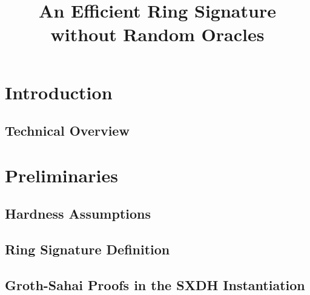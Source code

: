 \documentclass{llncs}
\title{An Efficient Ring Signature without Random Oracles}
\begin{document}
\maketitle

\begin{abstract}
    
\end{abstract} 

\section{Introduction}

     

   \subsection{Technical Overview} \label{sec:tech-overview}

	


    	



\section{Preliminaries}

	

	\subsection{Hardness Assumptions}

	

		\subsection{Ring Signature Definition}
    
            		

	\subsection{Groth-Sahai Proofs in the SXDH Instantiation} \label{sec:gs-proofs}

		
\end{document}
